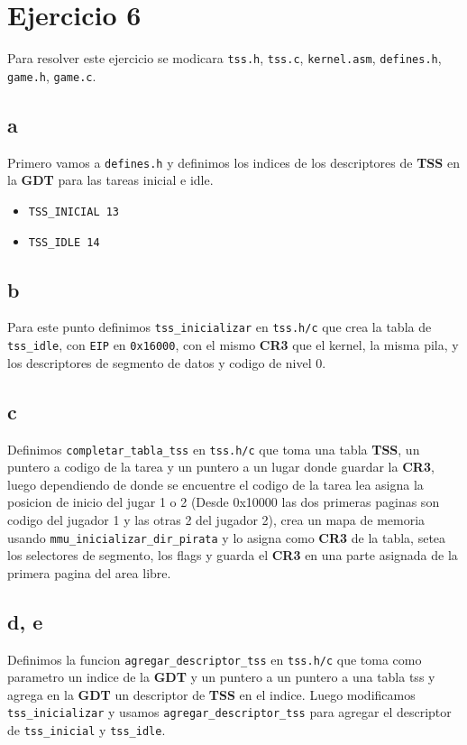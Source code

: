 \section{Ejercicio 6}

Para resolver este ejercicio se modicara \texttt{tss.h}, \texttt{tss.c}, \texttt{kernel.asm}, \texttt{defines.h}, \texttt{game.h}, \texttt{game.c}.

\subsection{a}
Primero vamos a \texttt{defines.h} y definimos los indices de los descriptores de \textbf{TSS} en la \textbf{GDT} para las tareas inicial e idle.

\begin{itemize}
	\item \texttt{TSS\_INICIAL	13}
	\item \texttt{TSS\_IDLE		14}
\end{itemize}

\subsection{b}
Para este punto definimos \texttt{tss\_inicializar} en \texttt{tss.h/c} que crea la tabla de \texttt{tss\_idle}, con \texttt{EIP} en \texttt{0x16000}, con el mismo \textbf{CR3} que el kernel, la misma pila, y los descriptores de segmento de datos y codigo de nivel 0.

\subsection{c}
Definimos \texttt{completar\_tabla\_tss} en \texttt{tss.h/c} que toma una tabla \textbf{TSS}, un puntero a codigo de la tarea y un puntero a un lugar donde guardar la \textbf{CR3}, luego dependiendo de donde se encuentre el codigo de la tarea lea asigna la posicion de inicio del jugar 1 o 2 (Desde 0x10000 las dos primeras paginas son codigo del jugador 1 y las otras 2 del jugador 2), crea un mapa de memoria usando \texttt{mmu\_inicializar\_dir\_pirata} y lo asigna como \textbf{CR3} de la tabla, setea los selectores de segmento, los flags y guarda el \textbf{CR3} en una parte asignada de la primera pagina del area libre.

\subsection{d, e}
Definimos la funcion \texttt{agregar\_descriptor\_tss} en \texttt{tss.h/c} que toma como parametro un indice de la \textbf{GDT} y un puntero a un puntero a una tabla tss y agrega en la \textbf{GDT} un descriptor de \textbf{TSS} en el indice.
Luego modificamos \texttt{tss\_inicializar} y usamos \texttt{agregar\_descriptor\_tss} para agregar el descriptor de \texttt{tss\_inicial} y \texttt{tss\_idle}.


